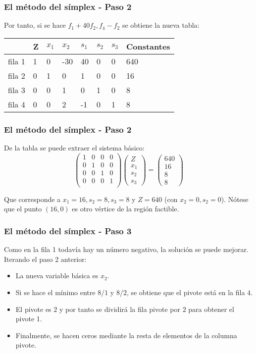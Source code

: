 \documentclass{beamer}
\begin{document}
\begin{frame}
\frametitle{El m\'etodo del s\'implex - Paso 2}
Por tanto, si se hace $f_1+40f_2, f_4-f_2$ se obtiene la nueva tabla:
\begin{tabular}{ |p{1cm}||p{0.8cm}|p{0.8cm}|p{0.8cm}|p{0.8cm}|p{0.8cm}|p{0.8cm}|p{1.6cm}|  }
 \hline
 & Z & $x_1$ & $x_2$ & $s_1$& $s_2$ & $s_3$ & Constantes \\
 \hline
fila 1 &1 & 0 & -30 & 40& 0& 0 & 640 \\
fila 2 & 0 &  1 & 0 & 1 & 0 & 0 & 16 \\
fila 3 & 0 & 0 & 1 & 0 & 1 & 0  & 8 \\
fila 4 &  0 & 0 & 2 &-1 &0 & 1  & 8\\
      \hline
\end{tabular}
\end{frame}






\begin{frame}
\frametitle{El m\'etodo del s\'implex - Paso 2}
De la tabla se puede extraer el sistema b\'asico:
\[\left(\begin{array}{cccc}
1&0&0&0 \\
0&1&0&0 \\
0&0&1&0 \\
0&0&0&1 \\
 \end{array}\right)
 \left(\begin{array}{c}
Z\\x_1\\s_2\\s_3
 \end{array}\right) = 
  \left(\begin{array}{c}
640\\16\\8\\8
 \end{array}\right) 
 \]

Que corresponde a $x_1=16, s_2 = 8, s_3 = 8$ y $Z=640$ (con $x_2=0, s_2 = 0$). N\'otese que el punto $(16,0)$ es otro v\'ertice de la regi\'on factible.
\end{frame}


\begin{frame}
\frametitle{El m\'etodo del s\'implex - Paso 3}
Como en la fila 1  todav\'ia hay un n\'umero negativo, la soluci\'on se puede mejorar. Iterando el paso 2 anterior:
\begin{itemize}
\item La nueva variable b\'asica es $x_2$. 
\item Si se hace el m\'inimo entre $8/1$ y $8/2$, se obtiene que el pivote est\'a en la fila $4$.
\item El pivote es $2$ y por tanto se dividir\'a la fila pivote por $2$ para obtener el pivote 1.
\item Finalmente, se hacen ceros mediante la resta de elementos de la columna pivote.
\end{itemize}
\end{frame}
\end{document}
